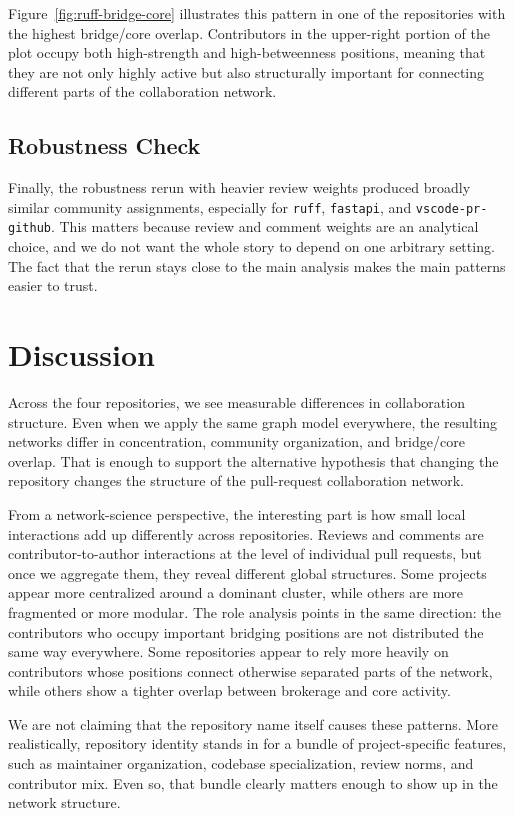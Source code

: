 \documentclass[11pt]{article}
\begin{document}
Figure~\ref{fig:ruff-bridge-core} illustrates this pattern in one of the repositories with the highest bridge/core overlap. Contributors in the upper-right portion of the plot occupy both high-strength and high-betweenness positions, meaning that they are not only highly active but also structurally important for connecting different parts of the collaboration network.

\subsection{Robustness Check}
Finally, the robustness rerun with heavier review weights produced broadly similar community assignments, especially for \texttt{ruff}, \texttt{fastapi}, and \texttt{vscode-pr-github}. This matters because review and comment weights are an analytical choice, and we do not want the whole story to depend on one arbitrary setting. The fact that the rerun stays close to the main analysis makes the main patterns easier to trust.

\section{Discussion}
Across the four repositories, we see measurable differences in collaboration structure. Even when we apply the same graph model everywhere, the resulting networks differ in concentration, community organization, and bridge/core overlap. That is enough to support the alternative hypothesis that changing the repository changes the structure of the pull-request collaboration network.

From a network-science perspective, the interesting part is how small local interactions add up differently across repositories. Reviews and comments are contributor-to-author interactions at the level of individual pull requests, but once we aggregate them, they reveal different global structures. Some projects appear more centralized around a dominant cluster, while others are more fragmented or more modular. The role analysis points in the same direction: the contributors who occupy important bridging positions are not distributed the same way everywhere. Some repositories appear to rely more heavily on contributors whose positions connect otherwise separated parts of the network, while others show a tighter overlap between brokerage and core activity.

We are not claiming that the repository name itself causes these patterns. More realistically, repository identity stands in for a bundle of project-specific features, such as maintainer organization, codebase specialization, review norms, and contributor mix. Even so, that bundle clearly matters enough to show up in the network structure.
\end{document}
